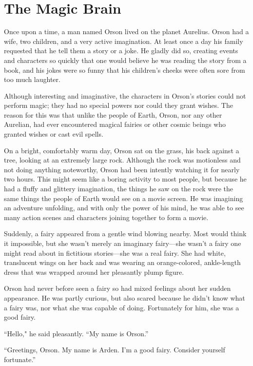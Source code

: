 \chapter{The Magic Brain}

Once upon a time, a man named Orson lived on the planet Aurelius. Orson had a wife, two children, and a very active imagination. At least once a day his family requested that he tell them a story or a joke. He gladly did so, creating events and characters so quickly that one would believe he was reading the story from a book, and his jokes were so funny that his children's cheeks were often sore from too much laughter.

Although interesting and imaginative, the characters in Orson's stories could not perform magic; they had no special powers nor could they grant wishes. The reason for this was that unlike the people of Earth, Orson, nor any other Aurelian, had ever encountered magical fairies or other cosmic beings who granted wishes or cast evil spells.

\timesep

On a bright, comfortably warm day, Orson sat on the grass, his back against a tree, looking at an extremely large rock. Although the rock was motionless and not doing anything noteworthy, Orson had been intently watching it for nearly two hours. This might seem like a boring activity to most people, but because he had a fluffy and glittery imagination, the things he saw on the rock were the same things the people of Earth would see on a movie screen. He was imagining an adventure unfolding, and with only the power of his mind, he was able to see many action scenes and characters joining together to form a movie.

Suddenly, a fairy appeared from a gentle wind blowing nearby. Most would think it impossible, but she wasn't merely an imaginary fairy—she wasn't a fairy one might read about in fictitious stories—she was a real fairy. She had white, translucent wings on her back and was wearing an orange-colored, ankle-length dress that was wrapped around her pleasantly plump figure.

Orson had never before seen a fairy so had mixed feelings about her sudden appearance. He was partly curious, but also scared because he didn't know what a fairy was, nor what she was capable of doing. Fortunately for him, she was a good fairy.

“Hello," he said pleasantly. “My name is Orson.”

“Greetings, Orson. My name is Arden. I'm a good fairy. Consider yourself fortunate.”

